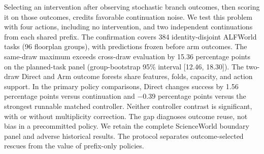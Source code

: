 Selecting an intervention after observing stochastic branch outcomes, then scoring it on those outcomes, credits favorable continuation noise. We test this problem with four actions, including no intervention, and two independent continuations from each shared prefix. The confirmation covers 384 identity-disjoint ALFWorld tasks (96 floorplan groups), with predictions frozen before arm outcomes. The same-draw maximum exceeds cross-draw evaluation by 15.36 percentage points on the planned-task panel (group-bootstrap 95\% interval [12.46, 18.30]). The two-draw Direct and Arm outcome forests share features, folds, capacity, and action support. In the primary policy comparisons, Direct changes success by 1.56 percentage points versus continuation and \ensuremath{-0.39} percentage points versus the strongest runnable matched controller. Neither controller contrast is significant, with or without multiplicity correction. The gap diagnoses outcome reuse, not bias in a precommitted policy. We retain the complete ScienceWorld boundary panel and adverse historical results. The protocol separates outcome-selected rescues from the value of prefix-only policies.
